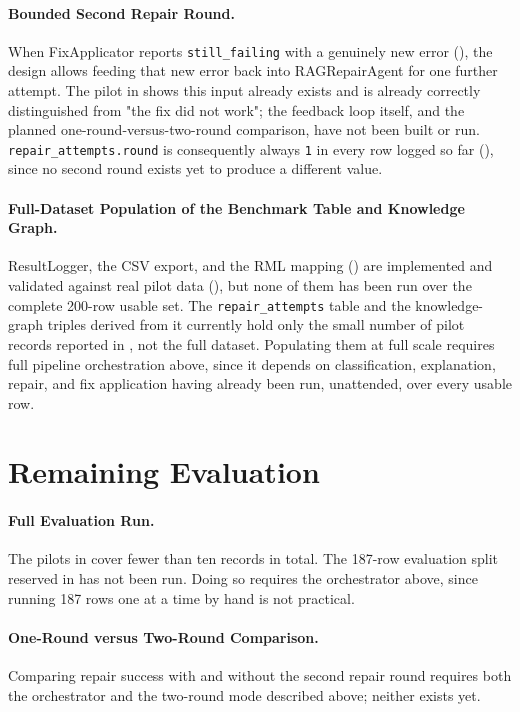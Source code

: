 \paragraph{Bounded Second Repair Round.} When FixApplicator reports
\texttt{still\_failing} with a genuinely new error
(), the design allows feeding that new error
back into RAGRepairAgent for one further attempt. The pilot in
 shows this input already exists and is already
correctly distinguished from "the fix did not work"; the feedback loop
itself, and the planned one-round-versus-two-round comparison, have not
been built or run. \texttt{repair\_attempts.round} is consequently always
\texttt{1} in every row logged so far (), since
no second round exists yet to produce a different value.

\paragraph{Full-Dataset Population of the Benchmark Table and Knowledge
Graph.} ResultLogger, the CSV export, and the RML mapping
() are implemented and validated against real
pilot data (), but none of them has been run over the
complete 200-row usable set. The \texttt{repair\_attempts} table and the
knowledge-graph triples derived from it currently hold only the small
number of pilot records reported in , not the full
dataset. Populating them at full scale requires full pipeline orchestration
above, since it depends on classification, explanation, repair, and fix
application having already been run, unattended, over every usable row.

\section{Remaining Evaluation}

\paragraph{Full Evaluation Run.} The pilots in  cover
fewer than ten records in total. The 187-row evaluation split reserved in
 has not been run. Doing so requires the
orchestrator above, since running 187 rows one at a time by hand is not
practical.

\paragraph{One-Round versus Two-Round Comparison.} Comparing repair success
with and without the second repair round requires both the orchestrator and
the two-round mode described above; neither exists yet.

